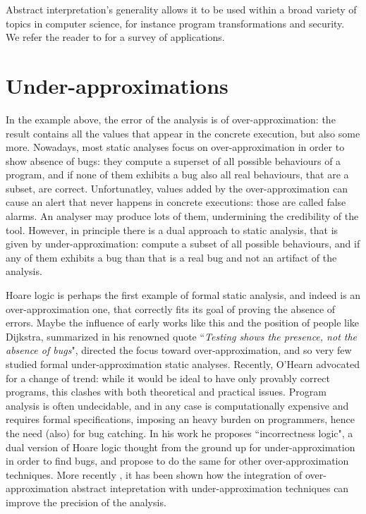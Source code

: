 Abstract interpretation's generality allows it to be used within a broad variety of topics in computer science, for instance program transformations and security. We refer the reader to \cite{cousot-absint-survey} for a survey of applications.

\section{Under-approximations}
In the example above, the error of the analysis is of over-approximation: the result contains all the values that appear in the concrete execution, but also some more.
Nowadays, most static analyses focus on over-approximation in order to show absence of bugs: they compute a superset of all possible behaviours of a program, and if none of them exhibits a bug also all real behaviours, that are a subset, are correct. Unfortunatley, values added by the over-approximation can cause an alert that never happens in concrete executions: those are called false alarms. An analyser may produce lots of them, undermining the credibility of the tool.
However, in principle there is a dual approach to static analysis, that is given by under-approximation: compute a subset of all possible behaviours, and if any of them exhibits a bug than that is a real bug and not an artifact of the analysis.

Hoare logic \cite{hoare-logic} is perhaps the first example of formal static analysis, and indeed is an over-approximation one, that correctly fits its goal of proving the absence of errors. Maybe the influence of early works like this and the position of people like Dijkstra, summarized in his renowned quote ``\textit{Testing shows the presence, not the absence of bugs}", directed the focus toward over-approximation, and so very few studied formal under-approximation static analyses.
Recently, O'Hearn \cite{ohearn-incorrectness-logic} advocated for a change of trend: while it would be ideal to have only provably correct programs, this clashes with both theoretical and practical issues. Program analysis is often undecidable, and in any case is computationally expensive and requires formal specifications, imposing an heavy burden on programmers, hence the need (also) for bug catching. In his work he proposes ``incorrectness logic", a dual version of Hoare logic thought from the ground up for under-approximation in order to find bugs, and propose to do the same for other over-approximation techniques.
More recently \cite{bruni-lcl}, it has been shown how the integration of over-approximation abstract intepretation with under-approximation techniques can improve the precision of the analysis.

